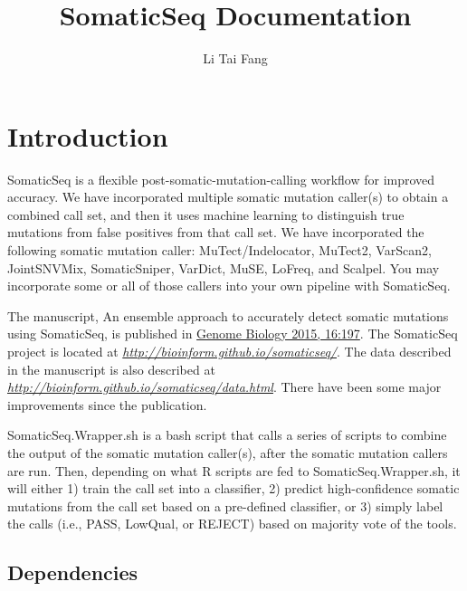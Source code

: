\documentclass[10pt,letterpaper]{article}
\author{Li Tai Fang}
\title{SomaticSeq Documentation}
\begin{document}
\maketitle



\begin{sloppypar}




\section{Introduction}

SomaticSeq is a flexible post-somatic-mutation-calling workflow for improved accuracy. We have incorporated multiple somatic mutation caller(s) to obtain a combined call set, and then it uses machine learning to distinguish true mutations from false positives from that call set. We have incorporated the following somatic mutation caller: MuTect/Indelocator, MuTect2, VarScan2, JointSNVMix, SomaticSniper, VarDict, MuSE, LoFreq, and Scalpel. You may incorporate some or all of those callers into your own pipeline with SomaticSeq.

The manuscript, An ensemble approach to accurately detect somatic mutations using SomaticSeq, is published in \href{http://dx.doi.org/10.1186/s13059-015-0758-2}{Genome Biology 2015, 16:197}. The SomaticSeq project is located at \href{http://bioinform.github.io/somaticseq/}{\textit{http://bioinform.github.io/somaticseq/}}. The data described in the manuscript is also described at \href{http://bioinform.github.io/somaticseq/data.html}{\textit{http://bioinform.github.io/somaticseq/data.html}}. There have been some major improvements since the publication. 

SomaticSeq.Wrapper.sh is a bash script that calls a series of scripts to combine the output of the somatic mutation caller(s), after the somatic mutation callers are run. Then, depending on what R scripts are fed to SomaticSeq.Wrapper.sh, it will either 1) train the call set into a classifier, 2) predict high-confidence somatic mutations from the call set based on a pre-defined classifier, or 3) simply label the calls (i.e., PASS, LowQual, or REJECT) based on majority vote of the tools. 

\subsection{Dependencies}

\begin{itemize}


\end{itemize}
\end{sloppypar}
\end{document}
